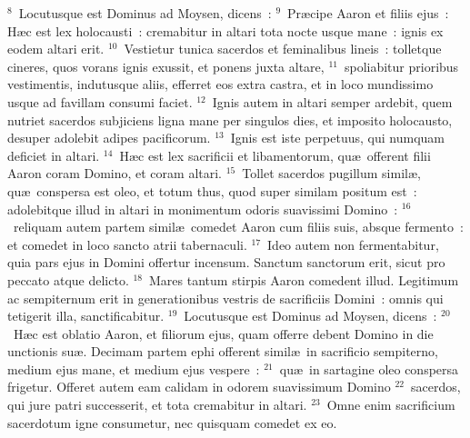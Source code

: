 ${}^{8}$~Locutusque est Dominus ad Moysen, dicens~:
${}^{9}$~Pr\ae cipe Aaron et filiis ejus~: H\ae c est lex holocausti~: cremabitur in altari tota nocte usque mane~: ignis ex eodem altari erit.
${}^{10}$~Vestietur tunica sacerdos et feminalibus lineis~: tolletque cineres, quos vorans ignis exussit, et ponens juxta altare,
${}^{11}$~spoliabitur prioribus vestimentis, indutusque aliis, efferret eos extra castra, et in loco mundissimo usque ad favillam consumi faciet.
${}^{12}$~Ignis autem in altari semper ardebit, quem nutriet sacerdos subjiciens ligna mane per singulos dies, et imposito holocausto, desuper adolebit adipes pacificorum.
${}^{13}$~Ignis est iste perpetuus, qui numquam deficiet in altari.
${}^{14}$~H\ae c est lex sacrificii et libamentorum, qu\ae\ offerent filii Aaron coram Domino, et coram altari.
${}^{15}$~Tollet sacerdos pugillum simil\ae , qu\ae\ conspersa est oleo, et totum thus, quod super similam positum est~: adolebitque illud in altari in monimentum odoris suavissimi Domino~:
${}^{16}$~reliquam autem partem simil\ae\ comedet Aaron cum filiis suis, absque fermento~: et comedet in loco sancto atrii tabernaculi.
${}^{17}$~Ideo autem non fermentabitur, quia pars ejus in Domini offertur incensum. Sanctum sanctorum erit, sicut pro peccato atque delicto.
${}^{18}$~Mares tantum stirpis Aaron comedent illud. Legitimum ac sempiternum erit in generationibus vestris de sacrificiis Domini~: omnis qui tetigerit illa, sanctificabitur.
${}^{19}$~Locutusque est Dominus ad Moysen, dicens~:
${}^{20}$~H\ae c est oblatio Aaron, et filiorum ejus, quam offerre debent Domino in die unctionis su\ae . Decimam partem ephi offerent simil\ae\ in sacrificio sempiterno, medium ejus mane, et medium ejus vespere~:
${}^{21}$~qu\ae\ in sartagine oleo conspersa frigetur. Offeret autem eam calidam in odorem suavissimum Domino
${}^{22}$~sacerdos, qui jure patri successerit, et tota cremabitur in altari.
${}^{23}$~Omne enim sacrificium sacerdotum igne consumetur, nec quisquam comedet ex eo.


